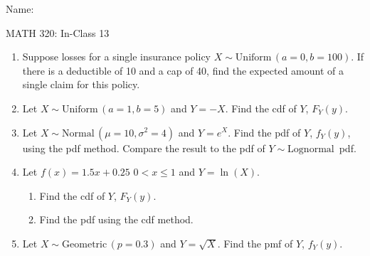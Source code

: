 \documentclass{article}
\newcommand{\follow}[1]{\sim \text{#1}\,}		%
\begin{document}
\hspace{375pt}Name:

\begin{center}
{\Huge MATH 320: In-Class 13}

\end{center}
\bigskip\bigskip



\begin{enumerate}
    \item Suppose losses for a single insurance policy $X \follow{Uniform}(a = 0, b = 100)$. If there is a deductible of 10 and a cap of 40, find the expected amount of a single claim for this policy.\vspace{200pt}%
    
    \item Let $X \follow{Uniform}(a = 1, b = 5)$ and $Y = -X$. Find the cdf of $Y$, $F_Y(y)$.\vspace{200pt}
    
    \item Let $X \follow{Normal}(\mu = 10, \sigma^2 = 4)$ and $Y = e^X$. Find the pdf of $Y$, $f_Y(y)$, using the pdf method. Compare the result to the pdf of $Y \follow{Lognormal}$ pdf.\vspace{200pt}%
    
    \item Let $f(x) = 1.5x + 0.25$ \quad $0 < x \le 1$ and $Y = \ln(X)$.%
    \begin{enumerate}
        \item Find the cdf of $Y$, $F_Y(y)$.\vspace{200pt}
        \item Find the pdf using the cdf method.\vspace{200pt}
    \end{enumerate}
    
    \item Let $X \follow{Geometric}(p = 0.3)$ and $Y = \sqrt{X}$. Find the pmf of $Y$, $f_Y(y)$.\vspace{200pt}%

\end{enumerate}
\end{document}
